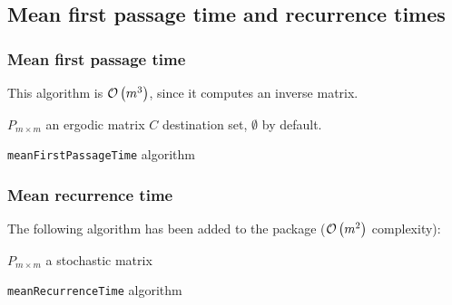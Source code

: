 \subsection{Mean first passage time and recurrence times}
 \begin{frame}\frametitle{Mean first passage time}
    \vspace{2.5em}
    
    This algorithm is \(\mathcal{O}\left(m^3\right)\), since it computes an inverse matrix.
    
    \begin{algorithm}[H]
    \begin{algorithmic}[1]
    \REQUIRE $P_{m \times m}$ an ergodic matrix
    \REQUIRE $C$ destination set, $\emptyset$ by default.
    \NEWLINE
    \ELSE
    \ENDIF
    \end{algorithmic}
    \caption{\texttt{meanFirstPassageTime} algorithm}
    \label{alg:mfpt}
    \end{algorithm}

\end{frame}

\begin{frame} \frametitle{Mean recurrence time}

    The following algorithm has been added to the package (\(\mathcal{O}\left(m^2\right)\) 
    complexity):

    \begin{algorithm}[H]
    \begin{algorithmic}[1]
    \REQUIRE $P_{m \times m}$ a stochastic matrix
    \NEWLINE
        \ENDIF
        \ENDFOR
    \ENDFOR
    \end{algorithmic}
    \caption{\texttt{meanRecurrenceTime} algorithm}
    \label{alg:mrt}
    \end{algorithm}

\end{frame}

